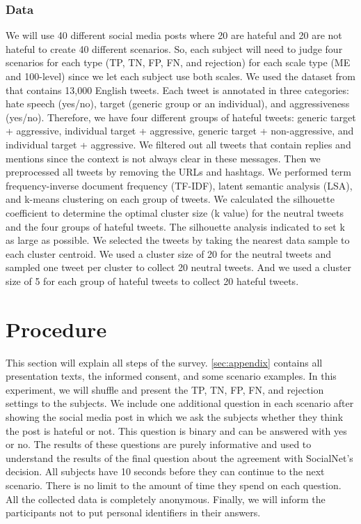 \documentclass[a4paper]{article}
\begin{document}
\subsubsection{Data}
We will use 40 different social media posts where 20 are hateful and 20 are not hateful to create 40 different scenarios. So, each subject will need to judge four scenarios for each type (TP, TN, FP, FN, and rejection) for each scale type (ME and 100-level) since we let each subject use both scales. We used the dataset from \cite{basile2019semeval} that contains 13,000 English tweets. Each tweet is annotated in three categories: hate speech (yes/no), target (generic group or an individual), and aggressiveness (yes/no). Therefore, we have four different groups of hateful tweets: generic target + aggressive, individual target + aggressive, generic target + non-aggressive, and individual target + aggressive. We filtered out all tweets that contain replies and mentions since the context is not always clear in these messages. Then we preprocessed all tweets by removing the URLs and hashtags. We performed term frequency-inverse document frequency (TF-IDF), latent semantic analysis (LSA), and k-means clustering on each group of tweets. We calculated the silhouette coefficient to determine the optimal cluster size (k value) for the neutral tweets and the four groups of hateful tweets. The silhouette analysis indicated to set k as large as possible. We selected the tweets by taking the nearest data sample to each cluster centroid. We used a cluster size of 20 for the neutral tweets and sampled one tweet per cluster to collect 20 neutral tweets. And we used a cluster size of 5 for each group of hateful tweets to collect 20 hateful tweets.

\section{Procedure}
This section will explain all steps of the survey. \autoref{sec:appendix} contains all presentation texts, the informed consent, and some scenario examples. In this experiment, we will shuffle and present the TP, TN, FP, FN, and rejection settings to the subjects. We include one additional question in each scenario after showing the social media post in which we ask the subjects whether they think the post is hateful or not. This question is binary and can be answered with yes or no. The results of these questions are purely informative and used to understand the results of the final question about the agreement with SocialNet's decision. All subjects have 10 seconds before they can continue to the next scenario. There is no limit to the amount of time they spend on each question. All the collected data is completely anonymous. Finally, we will inform the participants not to put personal identifiers in their answers.
\end{document}
